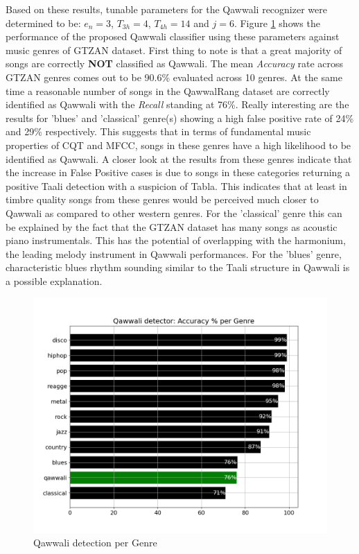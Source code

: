 \documentclass{article}
\begin{document}
Based on these results, tunable parameters for the Qawwali recognizer were determined to be: $e_{n}=3$, $T_{3h}=4$, $T_{4h}=14$ and $j=6$. Figure \ref{fig:src_genre} shows the performance of the proposed Qawwali classifier using these parameters against music genres of GTZAN dataset. First thing to note is that a great majority of songs are correctly \textbf{NOT} classified as Qawwali. The mean \textit{Accuracy} rate across GTZAN genres comes out to be 90.6\% evaluated across 10 genres. At the same time a reasonable number of songs in the QawwalRang dataset are correctly identified as Qawwali with the \textit{Recall} standing at 76\%. Really interesting are the results for 'blues' and 'classical' genre(s) showing a high false positive rate of 24\% and 29\% respectively. This suggests that in terms of fundamental music properties of CQT and MFCC, songs in these genres have a high likelihood to be identified as Qawwali. A closer look at the results from these genres indicate that the increase in False Positive cases is due to songs in these categories returning a positive Taali detection with a suspicion of Tabla. This indicates that at least in timbre quality songs from these genres would be perceived much closer to Qawwali as compared to other western genres. For the 'classical' genre this can be explained by the fact that the GTZAN dataset has many songs as acoustic piano instrumentals. This has the potential of overlapping with the  harmonium, the leading melody instrument in Qawwali performances. For the 'blues' genre, characteristic blues rhythm sounding similar to the Taali structure in Qawwali is a possible explanation.

\begin{figure}[htbp]
  \centering
  \includegraphics[scale=1.0, width=0.95\columnwidth]{genreA}
  \caption{Qawwali detection per Genre}
\label{fig:src_genre}
\end{figure}
\end{document}
